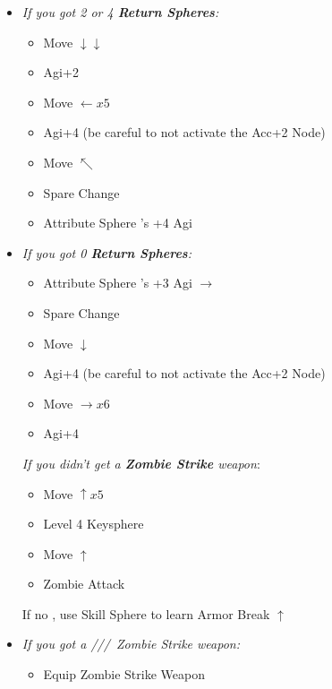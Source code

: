 \begin{spheregrid}
    \begin{itemize}
        \item \textit{If you got 2 or 4 \textbf{Return Spheres}:}
        \begin{itemize}
            \item Move $\downarrow\downarrow$
            \item Agi+2
            \item Move $\leftarrow x5$
            \item Agi+4 (be careful to not activate the Acc+2 Node)
            \item Move $\nwarrow$
            \item Spare Change
            \item Attribute Sphere \kimahri's +4 Agi
        \end{itemize}
        \item \textit{If you got 0 \textbf{Return Spheres}:}
        \begin{itemize}
            \item Attribute Sphere \rikku's +3 Agi $\rightarrow$
            \item Spare Change
            \item Move $\downarrow$
            \item Agi+4 (be careful to not activate the Acc+2 Node)
            \item Move $\rightarrow x6$
            \item Agi+4
        \end{itemize}
        \tidusf \textit{If you didn't get a \textbf{Zombie Strike} weapon}:
        \begin{itemize}
            \item Move $\uparrow x5$
            \item Level 4 Keysphere
            \item Move $\uparrow$
            \item Zombie Attack
        \end{itemize}
        \rikkuf If no \od, use Skill Sphere to learn Armor Break $\uparrow$
    \end{itemize}
\end{spheregrid}
\begin{equip}
    \begin{itemize}
        \item \textit{If you got a \lulu/\kimahri/\wakka/\rikku\ Zombie Strike weapon:}
        \begin{itemize}
            \item Equip Zombie Strike Weapon
        \end{itemize}
    \end{itemize}
\end{equip}
